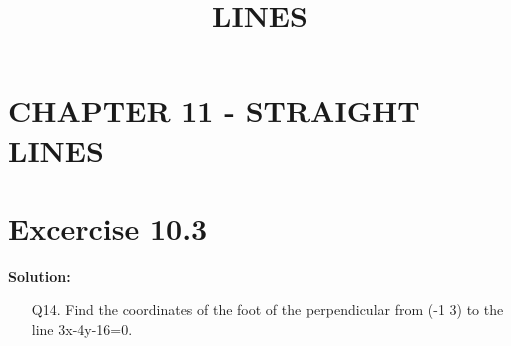 \documentclass[12pt]{article}
\newcommand{\solution}{\noindent \textbf{Solution: }}
\begin{document}
\begin{center}
\title{\textbf{LINES}}
\date{\vspace{-5ex}} %
\maketitle
\end{center}
\setcounter{page}{1}
\section*{CHAPTER 11 - STRAIGHT LINES}
\section*{Excercise 10.3}
\solution 
\begin{enumerate}
\item[Q14.] Find the coordinates of the foot of the perpendicular from (-1 3) to the line 3x-4y-16=0.  

\end{enumerate}
\end{document}
